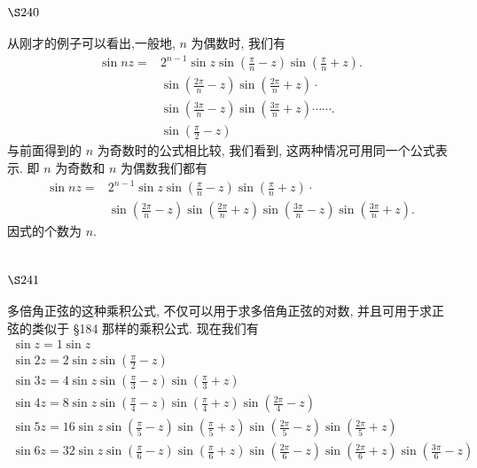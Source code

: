 \section{$\S 240$}

从刚才的例子可以看出,一般地, $n$ 为偶数时, 我们有
\[
\begin{aligned}
\sin n z= & 2^{n-1} \sin z \sin \left(\frac{\pi}{n}-z\right) \sin \left(\frac{\pi}{n}+z\right) . \\
& \sin \left(\frac{2 \pi}{n}-z\right) \sin \left(\frac{2 \pi}{n}+z\right) \cdot \\
& \sin \left(\frac{3 \pi}{n}-z\right) \sin \left(\frac{3 \pi}{n}+z\right) \cdots \cdots . \\
& \sin \left(\frac{\pi}{2}-z\right)
\end{aligned}
\]
与前面得到的 $n$ 为奇数时的公式相比较, 我们看到, 这两种情况可用同一个公式表示. 即 $n$ 为奇数和 $n$ 为偶数我们都有
\[
\begin{aligned}
\sin n z= & 2^{n-1} \sin z \sin \left(\frac{\pi}{n}-z\right) \sin \left(\frac{\pi}{n}+z\right) \cdot \\
& \sin \left(\frac{2 \pi}{n}-z\right) \sin \left(\frac{2 \pi}{n}+z\right) \sin \left(\frac{3 \pi}{n}-z\right) \sin \left(\frac{3 \pi}{n}+z\right) .
\end{aligned}
\]
因式的个数为 $n$.

\section{$\S 241$}

多倍角正弦的这种乘积公式, 不仅可以用于求多倍角正弦的对数, 并且可用于求正 弦的类似于 §184 那样的乘积公式. 现在我们有
\[
\begin{gathered}
\sin z=1 \sin z \\
\sin 2 z=2 \sin z \sin \left(\frac{\pi}{2}-z\right) \\
\sin 3 z=4 \sin z \sin \left(\frac{\pi}{3}-z\right) \sin \left(\frac{\pi}{3}+z\right) \\
\sin 4 z=8 \sin z \sin \left(\frac{\pi}{4}-z\right) \sin \left(\frac{\pi}{4}+z\right) \sin \left(\frac{2 \pi}{4}-z\right) \\
\sin 5 z=16 \sin z \sin \left(\frac{\pi}{5}-z\right) \sin \left(\frac{\pi}{5}+z\right) \sin \left(\frac{2 \pi}{5}-z\right) \sin \left(\frac{2 \pi}{5}+z\right) \\
\sin 6 z=32 \sin z \sin \left(\frac{\pi}{6}-z\right) \sin \left(\frac{\pi}{6}+z\right) \sin \left(\frac{2 \pi}{6}-z\right) \sin \left(\frac{2 \pi}{6}+z\right) \sin \left(\frac{3 \pi}{6}-z\right)
\end{gathered}
\]
